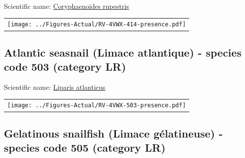 \documentclass[12pt]{article}\usepackage[]{graphicx}\usepackage[]{color}
\begin{document}
Scientific name: \href{http://www.marinespecies.org/aphia.php?p=taxdetails\&id=158960}{Coryphaenoides rupestris} \newline
\begin{minipage}{1.0\textwidth}
 \begin{tabular}{c}
\texttt{[image: ../Figures-Actual/RV-4VWX-414-presence.pdf]} \\ 
\end{tabular} 
\end{minipage}
\clearpage

\renewcommand\thefigure{\thesubsection\Alph{figure}}

\setcounter{figure}{0}

\hypertarget{sec:503}{%
\subsection{Atlantic seasnail (Limace atlantique) - species code 503 (category LR)}\label{sec:503}}

  


Scientific name: \href{http://www.marinespecies.org/aphia.php?p=taxdetails\&id=159524}{Liparis atlanticus} \newline
\begin{minipage}{1.0\textwidth}
 \begin{tabular}{c}
\texttt{[image: ../Figures-Actual/RV-4VWX-503-presence.pdf]} \\ 
\end{tabular} 
\end{minipage}
\clearpage

\renewcommand\thefigure{\thesubsection\Alph{figure}}

\setcounter{figure}{0}

\hypertarget{sec:505}{%
\subsection{Gelatinous snailfish (Limace gélatineuse) - species code 505 (category LR)}\label{sec:505}}

  

\end{document}
